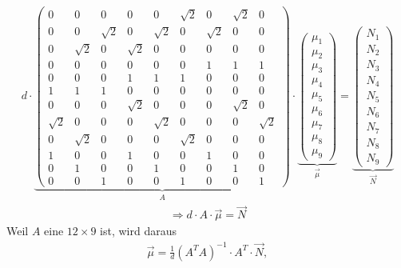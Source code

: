 \begin{align}
	d \cdot
	\underbrace{
	\begin{pmatrix}
		0 & 0 & 0  & 0 & 0 & \sqrt{2} & 0  & \sqrt{2} & 0\\
		 0&0  &\sqrt{2} & 0 & \sqrt{2} & 0 & \sqrt{2} & 0 & 0\\
		 0& \sqrt{2} & 0 & \sqrt{2} & 0 &0 &0  &0  &0 \\
		0&0 &0 &0 &0 &0 & 1 & 1 & 1\\
		0&0 &0 & 1 & 1 & 1 &0 &0 &0 \\
		1 & 1& 1 & 0&0 &0 &0 &0 &0\\
		0&0 &0 & \sqrt{2} & 0 &0 &0& \sqrt{2} &0\\
		\sqrt{2} & 0 & 0& 0 &\sqrt{2} &0 &0 &0 &\sqrt{2}\\
		0 & \sqrt{2} & 0 & 0 & 0 & \sqrt{2} & 0 & 0 &0\\
		1 &0 &0  &1 &0 &0 & 1 & 0 &0 \\
		0 & 1 & 0 & 0 & 1 & 0 & 0 & 1 &0 \\
		0 & 0& 1 & 0 & 0 & 1 & 0 & 0 & 1
	\end{pmatrix}
	}_{A}
	\cdot
	\underbrace{
	\begin{pmatrix}
		\mu_1\\
		\mu_2\\
		\mu_3\\
		\mu_4\\
		\mu_5\\
		\mu_6\\
		\mu_7\\
		\mu_8\\
		\mu_9
	\end{pmatrix}
	}_{\vec{\mu}}
	=
	\underbrace{
	\begin{pmatrix}
		N_1\\
		N_2\\
		N_3\\
		N_4\\
		N_5\\
		N_6\\
		N_7\\
		N_8\\
		N_9		
	\end{pmatrix}
	}_{\vec{N}}\nonumber
\end{align}
\begin{align}	
	\Rightarrow d \cdot A\cdot\vec{\mu}=\vec{N}
\end{align}
Weil $A$ eine $12\times 9 $ ist, wird daraus
\begin{align}
	\vec{\mu}=\frac{1}{d}\left(A^TA\right)^{-1}\cdot A^T\cdot\vec{N},
		\label{eq:KleinsteQuadrate}
\end{align}
